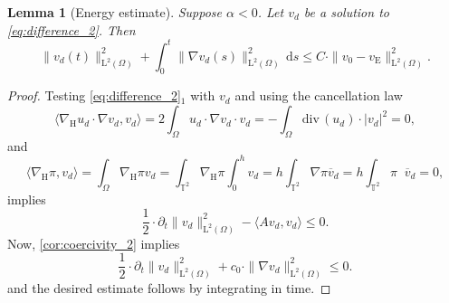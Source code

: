 \documentclass[preprint]{elsarticle}
\newtheorem{lem}[lem]{Lemma}
\numberwithin{equation}{section}
\newcommand {\T}	{\mathbb{T}}
\renewcommand{\d}{\, \mathrm{d}}
\DeclareMathOperator{\divH}{div_{\H}}
\renewcommand{\H}{\mathrm{H}}
\newcommand{\dk}[1]{\partial_{#1}}
\newcommand{\dt}{\dk{t}}
\newcommand{\dz}{\dk{z}}
\renewcommand{\bar}[1]{\overline{#1}}
\newcommand{\vbar}{\bar{v}}
\newcommand{\nablaH}{\nabla_{\H}}
\newcommand{\rL}{\mathrm{L}}
\newcommand{\rH}{\H}
\newcommand{\rE}{\mathrm{E}}
\newcommand{\btb}{\color{black}}
\renewcommand{\div}{\mathrm{div} \,}
\begin{document}
\begin{lem}[Energy estimate]\label{lem:energy_2}
	Suppose $\alpha < 0$. 
	Let $v_d$ be a solution to \eqref{eq:difference_2}. Then
	\begin{equation*}
		\| v_d(t) \|_{\rL^2(\Omega)}^2
		+ \int_0^t \| \nabla v_d(s) \|_{\rL^2(\Omega)}^2 \d s \leq C \cdot \| v_0-v_{\rE} \|_{\rL^2(\Omega)}^2 .
	\end{equation*}
\end{lem}
\begin{proof} 	
	Testing \eqref{eq:difference_2}$_1$ with $v_d$ and using the cancellation law
	\begin{equation*}
		\langle \nablaH u_d \cdot \nabla v_d , v_d \rangle 
		=
		2 \int_{\Omega} u_d \cdot \nabla v_d \cdot v_d 
		= -\int_{\Omega} \div(u_d) \cdot |v_d|^2 = 0,
	\end{equation*}
	and
	\begin{equation*}
		\langle \nablaH \pi , v_d \rangle =
		\int_{\Omega} \nablaH \pi v_d 
		= \int_{\T^2} \nablaH \pi \int_0^h v_d
		= h \int_{\T^2} \nabla \pi \vbar_d
		= h \int_{\T^2} \pi \divH\vbar_d = 0,
	\end{equation*}
	implies 
	\begin{equation*}
		\frac{1}{2}\cdot \dt \| v_d \|_{\rL^2(\Omega)}^2
		- \langle A v_d , v_d \rangle \leq 0 .
	\end{equation*}
	Now, \autoref{cor:coercivity_2} implies 
	\begin{equation*}
		\frac{1}{2} \cdot \dt \| v_d \|_{\rL^2(\Omega)}^2
		+ c_0 \cdot \| \nabla v_d \|_{\rL^2(\Omega)}^2 \leq 0 .
	\end{equation*}
	and the desired estimate follows by integrating in time. 

\end{proof}
\end{document}
